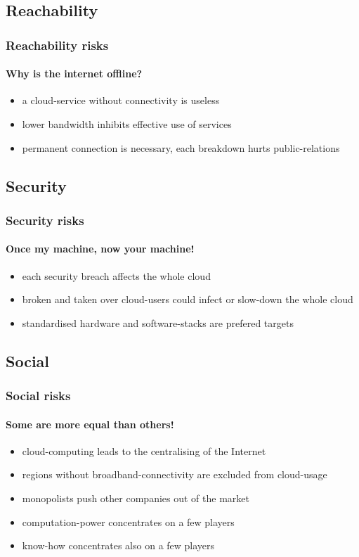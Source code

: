 \documentclass[]{beamer}
\begin{document}
\subsection{Reachability}

\begin{frame}
        \frametitle{Reachability risks}
        \framesubtitle{Why is the internet offline?}
        \begin{itemize}
                \item a cloud-service without connectivity is useless
                \item lower bandwidth inhibits effective use of services
                \item permanent connection is necessary, each breakdown hurts
                public-relations
        \end{itemize}
\end{frame}

\subsection{Security}

\begin{frame}
        \frametitle{Security risks}
        \framesubtitle{Once my machine, now your machine!}
        \begin{itemize}
                \item each security breach affects the whole cloud
                \item broken and taken over cloud-users could infect or
                slow-down the whole cloud
                \item standardised hardware and software-stacks are prefered
                targets
        \end{itemize}
\end{frame}

\subsection{Social}

\begin{frame}
        \frametitle{Social risks}
        \framesubtitle{Some are more equal than others!}
        \begin{itemize}
                \item cloud-computing leads to the centralising of the Internet
                \item regions without broadband-connectivity are excluded from
                cloud-usage
                \item monopolists push other companies out of the market
                \item computation-power concentrates on a few players
                \item know-how concentrates also on a few players
        \end{itemize}
\end{frame}
\end{document}
